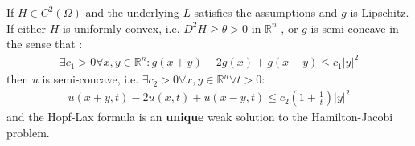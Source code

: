 \begin{theorem}
	If $H \in C^2(\Omega)$ and the underlying $L$ satisfies the assumptions and $g$ is Lipschitz. If either $H$ is uniformly convex, i.e. $D^2 H \geq \theta >0$ in $\mathbb{R}^n$ , or $g$ is semi-concave in the sense that :
		\begin{align*}
			\exists c_1 > 0 \forall x, y \in \mathbb{R}^n:
			g(x + y) - 2g(x) + g( x - y) \le c_1 |y|^2
		\end{align*}
		then $u$ is semi-concave, i.e.  $\exists c_2> 0 \forall x, y \in \mathbb{R}^n \forall t > 0$:
		\begin{align*}
			u(x+ y, t) - 2u(x, t) + u(x-y, t) \le c_2 (1 + \frac{1}{t} )|y|^2
		\end{align*}
		and the Hopf-Lax formula is an \textbf{unique} weak solution to the Hamilton-Jacobi problem. 
\end{theorem}
